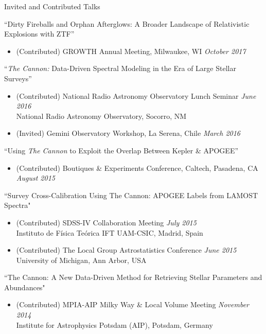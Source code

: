 \documentclass{resume} %
\begin{document}

\begin{rSection}{Invited and Contributed Talks}

``Dirty Fireballs and Orphan Afterglows: A Broader Landscape of Relativistic Explosions with ZTF''
\begin{itemize}
  \item
    (Contributed) GROWTH Annual Meeting, Milwaukee, WI
    \hfill {\em October 2017}
\end{itemize}

``\emph{The Cannon:} Data-Driven Spectral Modeling in the Era of Large Stellar Surveys''
\begin{itemize}
  \item
    (Contributed) National Radio Astronomy Observatory Lunch Seminar 
    \hfill {\em June 2016} \\
    National Radio Astronomy Observatory, Socorro, NM
  \item
  (Invited) Gemini Observatory Workshop, La Serena, Chile \hfill {\em March 2016}
\end{itemize}
``Using \emph{The Cannon} to Exploit the Overlap Between Kepler \& APOGEE''
\begin{itemize}
  \item
    (Contributed) Boutiques \& Experiments Conference, Caltech, Pasadena, CA \hfill {\em August 2015}
\end{itemize}
``Survey Cross-Calibration Using The Cannon: APOGEE Labels from LAMOST Spectra"
\begin{itemize}
\item
(Contributed) SDSS-IV Collaboration Meeting \hfill {\em July 2015} \\
Instituto de Física Teórica IFT UAM-CSIC, Madrid, Spain
\item
(Contributed) The Local Group Astrostatistics Conference \hfill {\em June 2015} \\
University of Michigan, Ann Arbor, USA
\end{itemize}

``The Cannon: A New Data-Driven Method for Retrieving Stellar Parameters and Abundances"
\begin{itemize}
\item
(Contributed) MPIA-AIP Milky Way \& Local Volume Meeting  \hfill {\em November 2014} \\
Institute for Astrophysics Potsdam (AIP), Potsdam, Germany
\end{itemize}


\end{rSection}
\end{document}
